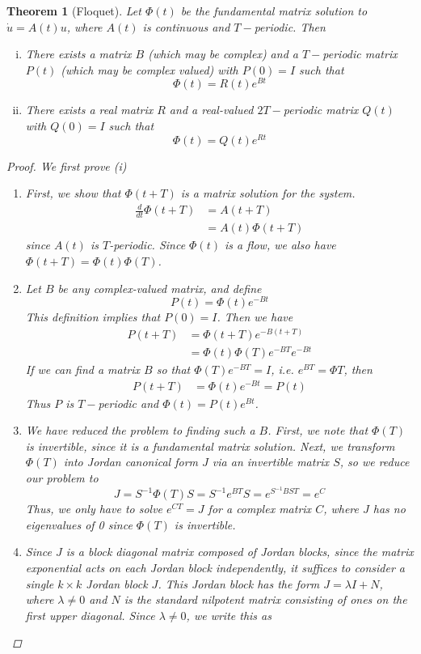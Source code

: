 \documentclass{article}
\newtheorem{theorem}{Theorem}[section]
\begin{document}
\begin{theorem}[Floquet]
Let $\Phi(t)$ be the fundamental matrix solution to $\dot{u} = A(t) u$, where $A(t)$ is continuous and $T-$periodic. Then
\begin{enumerate}[(i)]
\item There exists a matrix $B$ (which may be complex) and a $T-$periodic matrix $P(t)$ (which may be complex valued) with $P(0) = I$ such that 
\[
\Phi(t) = R(t)e^{Bt}
\]
\item There exists a real matrix $R$ and a real-valued $2T-$periodic matrix $Q(t)$ with $Q(0) = I$ such that
\[
\Phi(t) = Q(t)e^{Rt}
\]
\end{enumerate}
\begin{proof}
We first prove (i)
\begin{enumerate}
\item First, we show that $\Phi(t+T)$ is a matrix solution for the system.
\begin{align*}
\frac{d}{dt}\Phi(t+T) &= A(t+T) \\
&= A(t)\Phi(t+T)
\end{align*}
since $A(t)$ is $T$-periodic. Since $\Phi(t)$ is a flow, we also have $\Phi(t+T) = \Phi(t)\Phi(T)$.
\item Let $B$ be any complex-valued matrix, and define
\[
P(t) = \Phi(t) e^{-Bt}
\]
This definition implies that $P(0) = I$. Then we have
\begin{align*}
P(t+T) &= \Phi(t+T) e^{-B(t+T)} \\
&= \Phi(t)\Phi(T) e^{-B T} e^{-B t}
\end{align*}
If we can find a matrix $B$ so that $\Phi(T) e^{-B T} = I$, i.e. $e^{BT} = \Phi{T}$, then 
\begin{align*}
P(t+T) &= \Phi(t) e^{-B t} = P(t)
\end{align*}
Thus $P$ is $T-$periodic and $\Phi(t) = P(t) e^{Bt}$.
\item We have reduced the problem to finding such a $B$. First, we note that $\Phi(T)$ is invertible, since it is a fundamental matrix solution. Next, we transform $\Phi(T)$ into Jordan canonical form $J$ via an invertible matrix $S$, so we reduce our problem to 
\begin{equation}
J = S^{-1}\Phi(T)S = S^{-1}e^{BT}S 
= e^{S^{-1} B S T} = e^{C}
\end{equation}
Thus, we only have to solve $e^{CT} = J$ for a complex matrix $C$, where $J$ has no eigenvalues of 0 since $\Phi(T)$ is invertible. 
\item Since $J$ is a block diagonal matrix composed of Jordan blocks, since the matrix exponential acts on each Jordan block independently, it suffices to consider a single $k \times k$ Jordan block $J$. This Jordan block has the form $J = \lambda I + N$, where $\lambda \neq 0$ and $N$ is the standard nilpotent matrix consisting of ones on the first upper diagonal. Since $\lambda \neq 0$, we write this as

\end{enumerate}
\end{proof}
\end{theorem}
\end{document}
